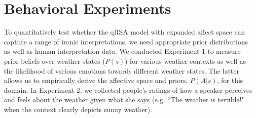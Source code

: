 \documentclass[10pt,letterpaper]{article}
\begin{document}



\section{Behavioral Experiments}
To quantitatively test whether the qRSA model with expanded affect space can capture a range of ironic interpretations, we need appropriate prior distributions as well as human interpretation data.
We conducted Experiment 1 to measure prior beliefs over weather states ($P(s)$) for various weather contexts as well as the likelihood of various emotions towards different weather states. The latter allows us to empirically derive the affective space and priors, $P(A | s)$, for this domain.
In Experiment 2, we collected people's ratings of how a speaker perceives and feels about the weather given what she says (e.g. ``The weather is terrible!" when the context clearly depicts sunny weather).
\end{document}
